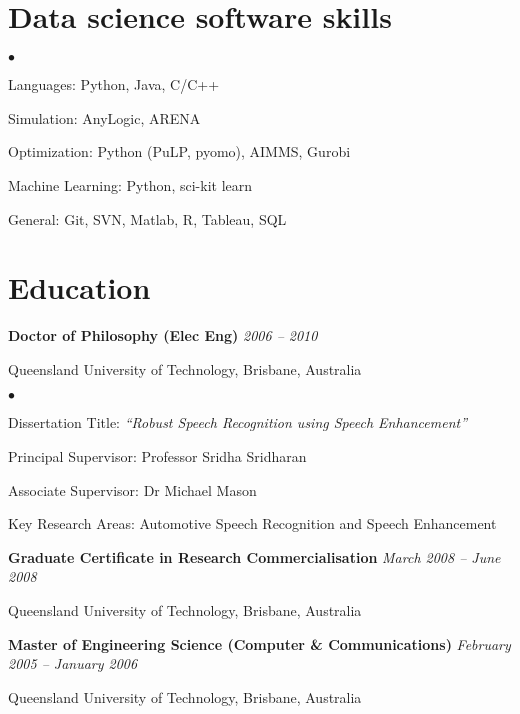 \documentclass[margin,line]{resume}
\newenvironment{list1}{
  \begin{list}{}{%
      \setlength{\itemsep}{0in}
      \setlength{\parsep}{0in} \setlength{\parskip}{0in}
      \setlength{\topsep}{0in} \setlength{\partopsep}{0in}
      \setlength{\leftmargin}{0.17in}}}{\end{list}}
\newenvironment{list2}{
  \begin{list}{$\bullet$}{%
      \setlength{\itemsep}{0in}
      \setlength{\parsep}{0in} \setlength{\parskip}{0in}
      \setlength{\topsep}{0in} \setlength{\partopsep}{0in}
      \setlength{\leftmargin}{0.2in}}}{\end{list}}
\begin{document}
\begin{resume}
\section{\sc Data science software skills}
\begin{list2}
\item Languages: Python, Java, C/C++
\item Simulation: AnyLogic, ARENA
\item Optimization: Python (PuLP, pyomo), AIMMS, Gurobi
\item Machine Learning: Python, sci-kit learn
\item General: Git, SVN, Matlab, R, Tableau, SQL
\end{list2}


\newpage

\section{\sc Education}
{\bf Doctor of Philosophy (Elec Eng)} \hfill {\it 2006 -- 2010}\\\vspace{-0.85\baselineskip}
\begin{list1}
\item[] Queensland University of Technology, Brisbane, Australia
\begin{list2}
\item Dissertation Title: {\it ``Robust Speech Recognition using Speech Enhancement''}
\item Principal Supervisor:  Professor Sridha Sridharan
\item Associate Supervisor: Dr Michael Mason
\item Key Research Areas: Automotive Speech Recognition and Speech Enhancement
\end{list2}
\end{list1}

{\bf Graduate Certificate in Research Commercialisation} \hfill {\it March 2008 -- June 2008}\\\vspace{-0.85\baselineskip}
\begin{list1}
\item[] Queensland University of Technology, Brisbane, Australia
\end{list1}

{\bf Master of Engineering Science (Computer \& Communications)} \hfill {\it February 2005 -- January 2006}\\\vspace{-0.85\baselineskip}
\begin{list1}
\item[] Queensland University of Technology, Brisbane, Australia
\end{list1}


\end{resume}
\end{document}
